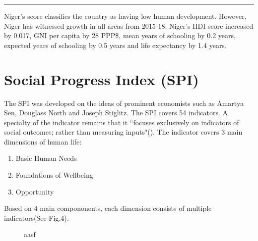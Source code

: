 \documentclass[11pt, a4paper]{article}
\begin{document}
		\doublespacing
		\vspace*{-\baselineskip}
		\noindent\rule{15.92cm}{0.4pt}
		\vspace*{-3mm}
		
		Niger's score classifies the country as having low human development. However, Niger has witnessed growth in all areas from 2015-18. Niger's HDI score increased by 0.017, GNI per capita by 28 PPP\$, mean years of schooling by 0.2 years, expected years of schooling by 0.5 years and life expectancy by 1.4 years.
		
		\vspace*{-7mm}
	\section{Social Progress Index (SPI)}
		\vspace*{-4mm}
			The SPI was developed on the ideas of prominent economists such as Amartya Sen, Douglass North and Joseph Stiglitz. The SPI covers 54 indicators. A specialty of the indicator remains that it ``focuses exclusively on indicators of social outcomes; rather than measuring inputs"(\citeauthor{socialprogressimperativeSOCIALPROGRESSINDEX2013}). The indicator covers 3 main dimensions of human life:
			
			\vspace*{-4mm}
			\singlespacing
			\begin{enumerate}
				\item Basic Human Needs
				\item Foundations of Wellbeing
				\item Opportunity
			\end{enumerate}
			\doublespacing
			\vspace*{-5mm}

			Based on 4 main compononents, each dimension consists of multiple indicators(See Fig.4).

			\begin{figure}[H]
				\centering
				
				\caption{aasf}
			\end{figure}

			\vspace*{-6mm}
\end{document}
